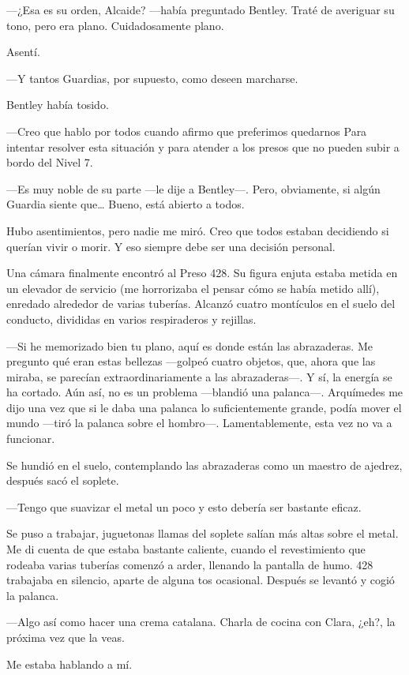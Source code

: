 ---¿Esa es su orden, Alcaide? ---había preguntado Bentley. Traté de
averiguar su tono, pero era plano. Cuidadosamente plano.

Asentí.

---Y tantos Guardias, por supuesto, como deseen marcharse.

Bentley había tosido.

---Creo que hablo por todos cuando afirmo que preferimos quedarnos Para
intentar resolver esta situación y para atender a los presos que no
pueden subir a bordo del Nivel 7.

---Es muy noble de su parte ---le dije a Bentley---. Pero, obviamente,
si algún Guardia siente que\ldots{} Bueno, está abierto a todos.

Hubo asentimientos, pero nadie me miró. Creo que todos estaban
decidiendo si querían vivir o morir. Y eso siempre debe ser una decisión
personal.

Una cámara finalmente encontró al Preso 428. Su figura enjuta estaba
metida en un elevador de servicio (me horrorizaba el pensar cómo se
había metido allí), enredado alrededor de varias tuberías. Alcanzó
cuatro montículos en el suelo del conducto, divididas en varios
respiraderos y rejillas.

---Si he memorizado bien tu plano, aquí es donde están las abrazaderas.
Me pregunto qué eran estas bellezas ---golpeó cuatro objetos, que, ahora
que las miraba, se parecían extraordinariamente a las abrazaderas---. Y
sí, la energía se ha cortado. Aún así, no es un problema ---blandió una
palanca---. Arquímedes me dijo una vez que si le daba una palanca lo
suficientemente grande, podía mover el mundo ---tiró la palanca sobre el
hombro---. Lamentablemente, esta vez no va a funcionar.

Se hundió en el suelo, contemplando las abrazaderas como un maestro de
ajedrez, después sacó el soplete.

---Tengo que suavizar el metal un poco y esto debería ser bastante
eficaz.

Se puso a trabajar, juguetonas llamas del soplete salían más altas sobre
el metal. Me di cuenta de que estaba bastante caliente, cuando el
revestimiento que rodeaba varias tuberías comenzó a arder, llenando la
pantalla de humo. 428 trabajaba en silencio, aparte de alguna tos
ocasional. Después se levantó y cogió la palanca.

---Algo así como hacer una crema catalana. Charla de cocina con Clara,
¿eh?, la próxima vez que la veas.

Me estaba hablando a mí.

